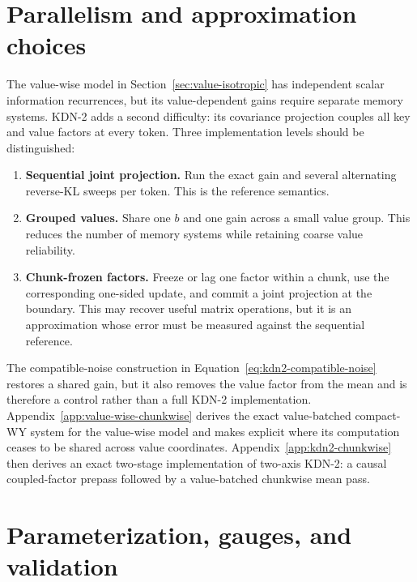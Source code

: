 \documentclass[11pt]{article}
\begin{document}
\section{Parallelism and approximation choices}
\label{sec:parallelism}

The value-wise model in Section~\ref{sec:value-isotropic} has independent scalar information
recurrences, but its value-dependent gains require separate memory systems.  KDN-2 adds a second
difficulty: its covariance projection couples all key and value factors at every token.  Three
implementation levels should be distinguished:
\begin{enumerate}
  \item \textbf{Sequential joint projection.}  Run the exact gain and several alternating
    reverse-KL sweeps per token.  This is the reference semantics.
  \item \textbf{Grouped values.}  Share one $b$ and one gain across a small value group.  This
    reduces the number of memory systems while retaining coarse value reliability.
  \item \textbf{Chunk-frozen factors.}  Freeze or lag one factor within a chunk, use the
    corresponding one-sided update, and commit a joint projection at the boundary.  This may
    recover useful matrix operations, but it is an approximation whose error must be measured
    against the sequential reference.
\end{enumerate}
The compatible-noise construction in Equation~\eqref{eq:kdn2-compatible-noise} restores a shared
gain, but it also removes the value factor from the mean and is therefore a control rather than a
full KDN-2 implementation.
Appendix~\ref{app:value-wise-chunkwise} derives the exact value-batched compact-WY system for the
value-wise model and makes explicit where its computation ceases to be shared across value
coordinates.
Appendix~\ref{app:kdn2-chunkwise} then derives an exact two-stage implementation of two-axis
KDN-2: a causal coupled-factor prepass followed by a value-batched chunkwise mean pass.

\section{Parameterization, gauges, and validation}
\label{sec:validation}
\end{document}
